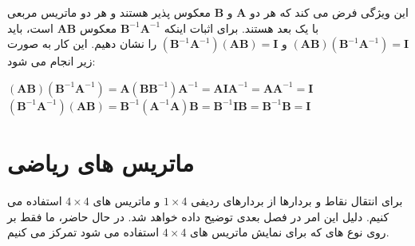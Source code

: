 {\begin{spacing}{1.5}
        این ویژگی فرض می کند که هر دو $\textbf{A}$ و $\textbf{B}$ معکوس پذیر هستند و هر دو ماتریس مربعی با یک بعد هستند.
        برای اثبات اینکه $\textbf{B}^{-1}\textbf{A}^{-1}$ معکوس $\textbf{AB}$ است، باید $(\textbf{AB})(\textbf{B}^{-1}\textbf{A}^{-1})=\textbf{I}$ و $(\textbf{B}^{-1}\textbf{A}^{-1})(\textbf{AB})=\textbf{I}$ را نشان دهیم.
        این کار به صورت زیر انجام می شود:

        \begin{center}
            $(\textbf{AB})(\textbf{B}^{-1}\textbf{A}^{-1})=\textbf{A}(\textbf{B}\textbf{B}^{-1})\textbf{A}^{-1}=\textbf{A}\textbf{I}\textbf{A}^{-1}=\textbf{A}\textbf{A}^{-1}=\textbf{I}$\\
            $(\textbf{B}^{-1}\textbf{A}^{-1})(\textbf{AB})=\textbf{B}^{-1}(\textbf{A}^{-1}\textbf{A})\textbf{B}=\textbf{B}^{-1}\textbf{I}\textbf{B}=\textbf{B}^{-1}\textbf{B}=\textbf{I}$\\
        \end{center}
    \end{spacing}
}


\section{\textbf{ماتریس های ریاضی }}
\label{sec:2.8}
{
    \Large
    \begin{spacing}{1.5}
        برای انتقال نقاط و بردارها از بردارهای ردیفی $1\times 4$ و ماتریس های $4\times 4$ استفاده می کنیم.
        دلیل این امر در فصل بعدی توضیح داده خواهد شد.
        در حال حاضر، ما فقط بر روی نوع های  که برای نمایش ماتریس های $4\times 4$ استفاده می شود تمرکز می کنیم.
    \end{spacing}
}

